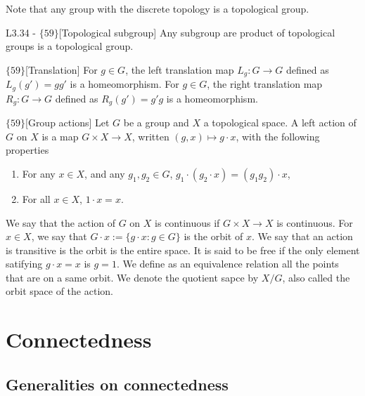 \documentclass{article}
\begin{document}
Note that any group with the discrete topology is a topological group.

\begin{flexilemma}{L3.34 - $\{59\}$}[Topological subgroup]
    Any subgroup are product of topological groups is a topological group.
\end{flexilemma}

\begin{flexidefinition}{$\{59\}$}[Translation]
    For $g \in G$, the left translation map $L_g : G \to G$ defined as $L_g(g') = gg'$ is a homeomorphism. For $g \in G$, the right translation map $R_g : G \to G$ defined as $R_g(g') = g'g$ is a homeomorphism. 
\end{flexidefinition}

\begin{flexidefinition}{$\{59\}$}[Group actions]
    Let $G$ be a group and $X$ a topological space. A left action of $G$ on $X$ is a map $G \times X \to X$, written $(g,x) \mapsto g \cdot x$, with the following properties
    \begin{enumerate}[label = (\roman*)]
        \item For any $x \in X$, and any $g_1,g_2 \in G$, $g_1 \cdot (g_2 \cdot x) = (g_1g_2) \cdot x$,
        \item For all $x \in X$, $1 \cdot x = x$.
    \end{enumerate}
    We say that the action of $G$ on $X$ is continuous if $G \times X \to X$ is continuous. For $x \in X$, we say that $G \cdot x := \{g \cdot x : g \in G\}$ is the orbit of $x$. We say that an action is transitive is the orbit is the entire space. It is said to be free if the only element satifying $g \cdot x = x$ is $g = 1$. We define as an equivalence relation all the points that are on a same orbit. We denote the quotient sapce by $X/G$, also called the orbit space of the action.
\end{flexidefinition}

\section{Connectedness}

\subsection{Generalities on connectedness}
\end{document}
